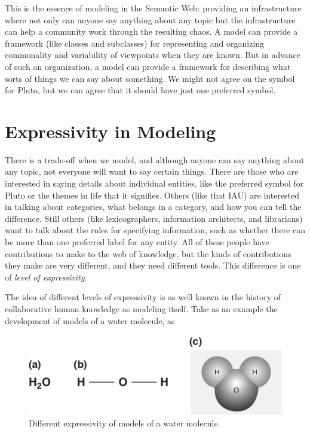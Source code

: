 This is the essence of modeling in the Semantic Web: providing an
infrastructure where not only can anyone say anything about any topic
but the infrastructure can help a community work through the resulting
chaos. A model can provide a framework (like classes and subclasses) for
representing and organizing commonality and variability of viewpoints
when they are known. But in advance of such an organization, a model can
provide a framework for describing what sorts of things we can say about
something. We might not agree on the symbol for Pluto, but we can agree
that it should have just one preferred symbol.

\section{Expressivity in Modeling}

There is a trade-off when we model, and although anyone can say anything
about any topic, not everyone will want to say certain things. There are
those who are interested in saying details about individual entities,
like the preferred symbol for Pluto or the themes in life that it
signifies. Others (like that IAU) are interested in talking about
categories, what belongs in a category, and how you can tell the
difference. Still others (like lexicographers, information architects,
and librarians) want to talk about the rules for specifying information,
such as whether there can be more than one preferred label for any
entity. All of these people have contributions to make to the web of
knowledge, but the kinds of contributions they make are very different,
and they need different tools. This difference is one of \emph{level of
expressivity}.

The idea of different levels of expressivity is as well known in the
history of collaborative human knowledge as modeling itself. Take as an
example the development of models of a water molecule, as

\begin{figure}
    \centering
    \includegraphics[width=5.0in]{media/ch2/f02-04ac-9780123859655.jpg}
    \caption{Different expressivity of models of a water molecule.}
    \label{fig:ch2.4}
\end{figure}


